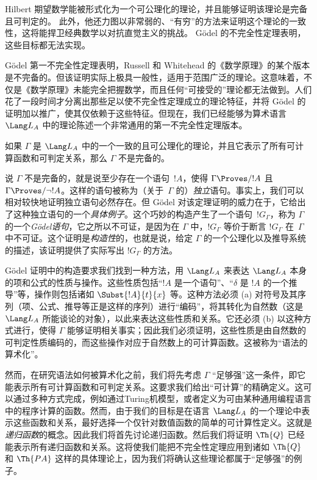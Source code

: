 \documentclass[../../../include/open-logic-section]{subfiles}
\begin{document}


Hilbert 期望数学能被形式化为一个可公理化的理论，并且能够证明该理论是完备且可判定的。
此外，他还力图以非常弱的、“有穷”的方法来证明这个理论的一致性，这将能捍卫经典数学以对抗直觉主义的挑战。
Gödel 的不完全性定理表明，这些目标都无法实现。

Gödel 第一不完全性定理表明，Russell 和 Whitehead 的《数学原理》的某个版本是不完备的。但该证明实际上极具一般性，适用于范围广泛的理论。这意味着，不仅是《数学原理》未能完全把握数学，而且任何“可接受的”理论都无法做到。人们花了一段时间才分离出那些足以使不完全性定理成立的理论特征，并将 Gödel 的证明加以推广，使其仅依赖于这些特征。但现在，我们已经能够为算术语言 $\Lang L_A$ 中的理论陈述一个非常通用的第一不完全性定理版本。

\begin{thm}
如果 $\Gamma$ 是 $\Lang L_A$ 中的一个一致的且可公理化的理论，并且它表示了所有可计算函数和可判定关系，那么 $\Gamma$ 不是完备的。
\end{thm}

说 $\Gamma$ 不是完备的，就是说至少存在一个语句~$!A$，使得 $\Gamma \Proves/ !A$ 且 $\Gamma \Proves/ \lnot !A$。这样的语句被称为（关于~$\Gamma$ 的）\emph{独立}语句。事实上，我们可以相对较快地证明独立语句必然存在。但 Gödel 对该定理证明的威力在于，它给出了这种独立语句的一个\emph{具体例子}。这个巧妙的构造产生了一个语句~$!G_\Gamma$，称为 $\Gamma$ 的一个\emph{Gödel语句}，它之所以不可证，是因为在 $\Gamma$ 中，$!G_\Gamma$ 等价于断言 $!G_\Gamma$ 在~$\Gamma$ 中不可证。这个证明是\emph{构造性}的，也就是说，给定 $\Gamma$ 的一个公理化以及推导系统的描述，该证明提供了实际写出 $!G_\Gamma$ 的方法。

Gödel 证明中的构造要求我们找到一种方法，用 $\Lang L_A$ 来表达 $\Lang L_A$ 本身的项和公式的性质与操作。这些性质包括“$!A$ 是一个语句”、“$\delta$ 是 $!A$ 的一个推导”等，操作则包括诸如 $\Subst{!A}{t}{x}$ 等。这种方法必须 (a) 对符号及其序列（项、公式、推导等正是这样的序列）进行“编码”，将其转化为自然数（这是 $\Lang L_A$ 所能谈论的对象），以此来表达这些性质和关系。它还必须 (b) 以这种方式进行，使得 $\Gamma$ 能够证明相关事实；因此我们必须证明，这些性质是由自然数的可判定性质编码的，而这些操作对应于自然数上的可计算函数。这被称为“语法的算术化”。

然而，在研究语法如何被算术化之前，我们将先考虑 $\Gamma$ “足够强”这一条件，即它能表示所有可计算函数和可判定关系。这要求我们给出“可计算”的精确定义。这可以通过多种方式完成，例如通过Turing机模型，或者定义为可由某种通用编程语言中的程序计算的函数。然而，由于我们的目标是在语言 $\Lang L_A$ 的一个理论中表示这些函数和关系，最好选择一个仅针对数值函数的简单的可计算性定义。这就是\emph{递归函数}的概念。因此我们将首先讨论递归函数。然后我们将证明 $\Th{Q}$ 已经能表示所有递归函数和关系。这将使我们能把不完全性定理应用到诸如 $\Th{Q}$ 和 $\Th{PA}$ 这样的具体理论上，因为我们将确认这些理论都属于“足够强”的例子。
\end{document}
